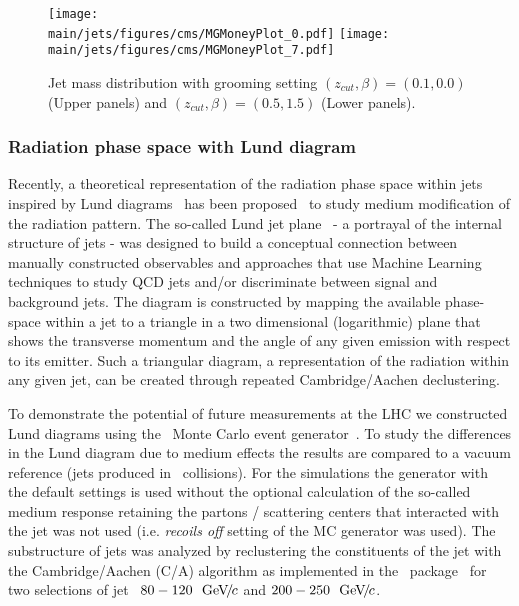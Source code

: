 %
\begin{figure}[!ht]
\begin{center}
\texttt{[image: \\main/jets/figures/cms/MGMoneyPlot\_0.pdf]}
\texttt{[image: \\main/jets/figures/cms/MGMoneyPlot\_7.pdf]}
\caption{Jet mass distribution with grooming setting $(z_{cut},\beta)=(0.1,0.0)$ (Upper panels) and $(z_{cut},\beta)=(0.5,1.5)$ (Lower panels).~\cite{CMS-FTR-17-002:2017dec}}
\label{fig:Mass}
\end{center}
\end{figure}


\newpage
\subsubsection{Radiation phase space with Lund diagram}

Recently, a theoretical representation of the radiation phase space within jets inspired by Lund diagrams~\cite{Andersson:1988gp} has been proposed~\cite{Andrews:2018jcm} to study medium modification of the radiation pattern. The so-called Lund jet plane~\cite{Dreyer:2018nbf} - a portrayal of the internal structure of jets - was designed to build a conceptual connection between manually constructed observables and approaches that use Machine Learning techniques to study QCD jets and/or discriminate between signal and background jets.
The diagram is constructed by mapping the available phase-space within a jet to a triangle in a two dimensional (logarithmic) plane that shows the transverse momentum and the angle of any given emission with respect to its emitter.
Such a triangular diagram, a representation of the radiation within any given jet, can be created through repeated Cambridge/Aachen declustering.

To demonstrate the potential of future measurements at the LHC we constructed Lund diagrams using the \jewel\ Monte Carlo event generator~\cite{Zapp:2013vla}.
To study the differences in the Lund diagram due to medium effects the results are compared to a vacuum reference (jets produced in \pp\ collisions). For the simulations the \jewel
 generator with the default settings is used without the optional calculation of the so-called medium response retaining the partons / scattering centers that interacted with the jet was not used (i.e. {\it recoils off} setting of the MC generator was used).
The substructure of jets was analyzed by reclustering the constituents of the jet with the Cambridge/Aachen (C/A) algorithm as implemented in the \fastjet\ package~\cite{Cacciari:2011ma,Cacciari:2005hq} for two selections of jet \pt\ $80-120~~\text{GeV}\!/\mspace{-2mu}c$ and $200-250~~\text{GeV}\!/\mspace{-2mu}c$.

